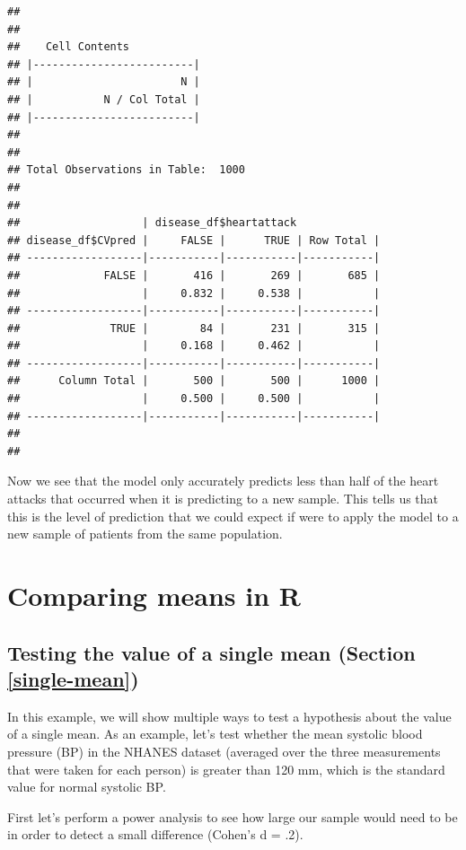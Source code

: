 \documentclass[12pt,]{book}
\begin{document}
\begin{verbatim}
## 
##  
##    Cell Contents
## |-------------------------|
## |                       N |
## |           N / Col Total |
## |-------------------------|
## 
##  
## Total Observations in Table:  1000 
## 
##  
##                   | disease_df$heartattack 
## disease_df$CVpred |     FALSE |      TRUE | Row Total | 
## ------------------|-----------|-----------|-----------|
##             FALSE |       416 |       269 |       685 | 
##                   |     0.832 |     0.538 |           | 
## ------------------|-----------|-----------|-----------|
##              TRUE |        84 |       231 |       315 | 
##                   |     0.168 |     0.462 |           | 
## ------------------|-----------|-----------|-----------|
##      Column Total |       500 |       500 |      1000 | 
##                   |     0.500 |     0.500 |           | 
## ------------------|-----------|-----------|-----------|
## 
## 
\end{verbatim}

Now we see that the model only accurately predicts less than half of the heart attacks that occurred when it is predicting to a new sample. This tells us that this is the level of prediction that we could expect if were to apply the model to a new sample of patients from the same population.

\hypertarget{comparing-means-in-r}{%
\chapter{Comparing means in R}\label{comparing-means-in-r}}

\hypertarget{testing-the-value-of-a-single-mean-section-refsingle-mean}{%
\section{Testing the value of a single mean (Section \ref{single-mean})}\label{testing-the-value-of-a-single-mean-section-refsingle-mean}}

In this example, we will show multiple ways to test a hypothesis about the value of a single mean. As an example, let's test whether the mean systolic blood pressure (BP) in the NHANES dataset (averaged over the three measurements that were taken for each person) is greater than 120 mm, which is the standard value for normal systolic BP.

First let's perform a power analysis to see how large our sample would need to be in order to detect a small difference (Cohen's d = .2).
\end{document}
